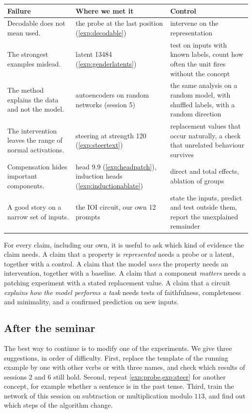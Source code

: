 \begin{center}\small
\begin{tabular}{@{}p{}p{}p{}@{}}
\toprule
Failure & Where we met it & Control \\
\midrule
Decodable does not mean used. & the probe at the last position (\cref{exp:decodable}) & intervene on the representation \\
\addlinespace
The strongest examples mislead. & latent 13484 (\cref{exp:genderlatents}) & test on inputs with known labels, count
how often the unit fires without the concept \\ \addlinespace
The method explains the data and not the model. & autoencoders on random networks (session 5) & the same
analysis on a random model, with shuffled labels, with a random direction \\ \addlinespace
The intervention leaves the range of normal activations. & steering at strength 120 (\cref{exp:steertext}) &
replacement values that occur naturally, a check that unrelated behaviour survives \\ \addlinespace
Compensation hides important components. & head 9.9 (\cref{exp:headpatch}), induction heads (\cref{exp:inductionablate}) &
direct and total effects, ablation of groups \\ \addlinespace
A good story on a narrow set of inputs. & the IOI circuit, our own 12 prompts & state the inputs, predict and
test outside them, report the unexplained remainder \\
\bottomrule
\end{tabular}
\end{center}

For every claim, including our own, it is useful to ask which kind of evidence the claim needs. A claim that a
property is \emph{represented} needs a probe or a latent, together with a control. A claim that the model
\emph{uses} the property needs an intervention, together with a baseline. A claim that a component \emph{matters}
needs a patching experiment with a stated replacement value. A claim that a circuit \emph{explains how the model
performs a task} needs tests of faithfulness, completeness and minimality, and a confirmed prediction on new
inputs.

\subsection{After the seminar}

The best way to continue is to modify one of the experiments. We give three suggestions, in order of
difficulty. First, replace the template of the running example by one with other verbs or with three names, and
check which results of sessions 2 and 6 still hold. Second, repeat \cref{exp:probe,exp:steer} for another concept,
for example whether a sentence is in the past tense. Third, train the network of this session on subtraction or
multiplication modulo $113$, and find out which steps of the algorithm change.

